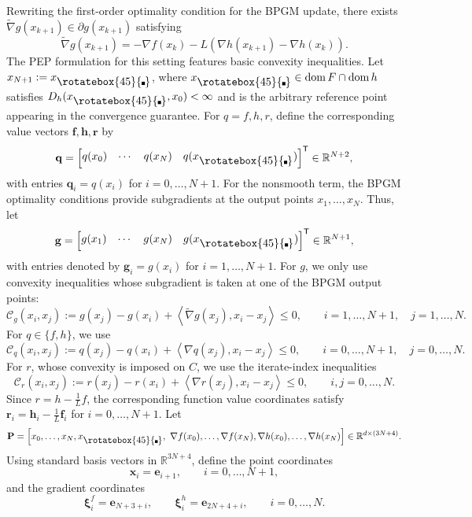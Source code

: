\documentclass{article}
\theoremstyle{definition}
\theoremstyle{plain}
\newcommand{\vxi}{{\boldsymbol{\xi}}}
\newcommand{\ve}{{\mathbf{e}}}
\newcommand{\vf}{{\mathbf{f}}}
\newcommand{\vg}{{\mathbf{g}}}
\newcommand{\vh}{{\mathbf{h}}}
\newcommand{\vq}{{\mathbf{q}}}
\newcommand{\vr}{{\mathbf{r}}}
\newcommand{\vx}{{\mathbf{x}}}
\newcommand{\vP}{{\mathbf{P}}}
\newcommand{\cC}{{\mathcal{C}}}
\newcommand{\tnabla}{\widetilde{\nabla}}
\newcommand{\dom}{\mathrm{dom}\,}
\newcommand{\reals}{\mathbb{R}}
\newcommand{\inprod}[2]{\left\langle #1,#2 \right\rangle}
\newcommand{\transpose}{\mathsf{T}}
\newcommand{\bmat}[1]{\begin{bmatrix} #1 \end{bmatrix}}
\newcommand{\compidx}{%
  \mathord{\mathchoice
    {\vcenter{\hbox{\rotatebox{45}{\rule{0.39em}{0.39em}}}}}
    {\vcenter{\hbox{\rotatebox{45}{\rule{0.39em}{0.39em}}}}}
    {\vcenter{\hbox{\rotatebox{45}{\rule{0.29em}{0.29em}}}}}
    {\vcenter{\hbox{\rotatebox{45}{\rule{0.23em}{0.23em}}}}}}%
}
\newcommand{\bregsm}{f}
\newcommand{\bregprox}{g}
\newcommand{\bregaux}{r}
\newcommand{\vbregsm}{\vf}
\newcommand{\vbregprox}{\vg}
\newcommand{\vbregaux}{\vr}
\begin{document}
Rewriting the first-order optimality condition for the BPGM update, there exists 
$\tnabla \bregprox(x_{k+1})\in\partial \bregprox(x_{k+1})$ satisfying
\begin{equation}
\label{eq:appendix-bpgm-optimality}
    \tnabla \bregprox(x_{k+1})
    =
    - \nabla \bregsm(x_k)
    -L\left(\nabla h(x_{k+1})-\nabla h(x_k)\right).
\end{equation}
The PEP formulation for this setting features basic convexity inequalities.
Let $x_{N+1}:=x_{\compidx}$, where $x_{\compidx}\in\dom F\cap\dom h$ satisfies $D_h(x_{\compidx},x_0)<\infty$ and is the arbitrary reference point appearing in the convergence guarantee.
For $q=\bregsm,h,\bregaux$, define the corresponding value vectors $\vbregsm,\vh,\vbregaux$ by
\[
    \vq=\bmat{q(x_0) & \cdots & q(x_N) & q(x_{\compidx})}^\transpose\in\reals^{N+2},
\]
with entries $\vq_i=q(x_i)$ for $i=0,\dots,N+1$.
For the nonsmooth term, the BPGM optimality conditions provide subgradients at the output points $x_1,\dots,x_N$.
Thus, let
\[
    \vbregprox=\bmat{\bregprox(x_1) & \cdots & \bregprox(x_N) & \bregprox(x_{\compidx})}^\transpose\in\reals^{N+1},
\]
with entries denoted by $\vbregprox_i=\bregprox(x_i)$ for $i=1,\dots,N+1$. 
For $\bregprox$, we only use convexity inequalities whose subgradient is taken at one of the BPGM output points:
\[
    \cC_{\bregprox}(x_i,x_j)
    :=
    \bregprox(x_j)-\bregprox(x_i)+\inprod{\tnabla \bregprox(x_j)}{x_i-x_j}\le 0,
    \qquad i=1,\dots,N+1,\quad j=1,\dots,N.
\]
For $q\in\{\bregsm,h\}$, we use
\[
    \cC_q(x_i,x_j)
    :=
    q(x_j)-q(x_i)+\inprod{\nabla q(x_j)}{x_i-x_j}\le 0,
    \qquad i=0,\dots,N+1,\quad j=0,\dots,N.
\]
For $\bregaux$, whose convexity is imposed on $C$, we use the iterate-index inequalities
\[
    \cC_{\bregaux}(x_i,x_j)
    :=
    \bregaux(x_j)-\bregaux(x_i)+\inprod{\nabla \bregaux(x_j)}{x_i-x_j}\le 0,
    \qquad i,j=0,\dots,N.
\]
Since $\bregaux=h-\frac{1}{L}\bregsm$, the corresponding function value coordinates satisfy $\vbregaux_i=\vh_i-\frac{1}{L}\vbregsm_i$ for $i=0,\dots,N+1$. 
Let
\[
\begin{aligned}
    \vP
    =
    \Bigl[
     x_0,\ldots,x_N, x_{\compidx},\
    \nabla \bregsm(x_0),\ldots,\nabla \bregsm(x_N),
    \nabla h(x_0),\ldots,\nabla h(x_N)
    \Bigr]
    \in \reals^{d\times(3N+4)} .
\end{aligned}
\]
Using standard basis vectors in $\reals^{3N+4}$, define the point coordinates
\[
    \vx_i=\ve_{i+1},
    \qquad i=0,\dots,N+1,
\]
and the gradient coordinates
\[
    \vxi_i^{\bregsm}=\ve_{N+3+i},
    \qquad
    \vxi_i^h=\ve_{2N+4+i},
    \qquad i=0,\dots,N.
\]
\end{document}
